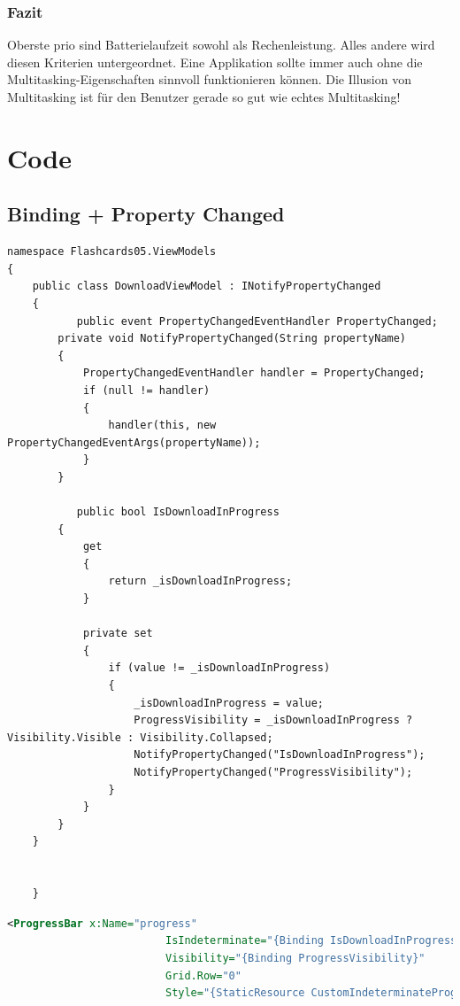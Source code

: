 \documentclass[a4paper,10pt]{scrreprt}
\begin{document}
\section{Fazit}
Oberste prio sind Batterielaufzeit sowohl als Rechenleistung. Alles andere wird diesen Kriterien untergeordnet. 
Eine Applikation sollte immer auch ohne die Multitasking-Eigenschaften sinnvoll funktionieren können.
Die Illusion von Multitasking ist für den Benutzer gerade so gut wie echtes Multitasking!
\part{Code}
\chapter{Binding + Property Changed}
\begin{lstlisting}[caption=Viewmodel + Umgang mit Property Changed]
namespace Flashcards05.ViewModels
{
    public class DownloadViewModel : INotifyPropertyChanged
    {
		   public event PropertyChangedEventHandler PropertyChanged;
        private void NotifyPropertyChanged(String propertyName)
        {
            PropertyChangedEventHandler handler = PropertyChanged;
            if (null != handler)
            {
                handler(this, new PropertyChangedEventArgs(propertyName));
            }
        }
        
           public bool IsDownloadInProgress
        {
            get
            {
                return _isDownloadInProgress;
            }

            private set
            {
                if (value != _isDownloadInProgress)
                {
                    _isDownloadInProgress = value;
                    ProgressVisibility = _isDownloadInProgress ? Visibility.Visible : Visibility.Collapsed;
                    NotifyPropertyChanged("IsDownloadInProgress");
                    NotifyPropertyChanged("ProgressVisibility");
                }
            }
        }    
    }

    
    }
\end{lstlisting}

\begin{lstlisting}[caption=Binding, language=xml]
<ProgressBar x:Name="progress" 
                         IsIndeterminate="{Binding IsDownloadInProgress}" 
                         Visibility="{Binding ProgressVisibility}"
                         Grid.Row="0"
                         Style="{StaticResource CustomIndeterminateProgressBar}"/>
\end{lstlisting}
\end{document}
